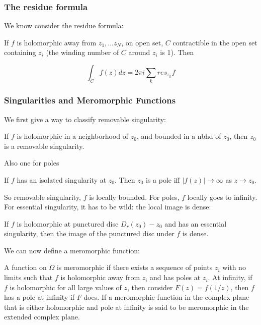 \documentclass[main.tex]{subfiles}
\begin{document}
\subsubsection{The residue formula}
We know consider the residue formula:

\begin{theorem}
If $f$ is holomorphic away from $z_1, ... z_N$, on open set, $C$ contractible in the open set containing $z_i$ (the winding number of $C$ around $z_i$ is 1). Then 

$$
\int_C f(z) dz = 2\pi i \sum_k res_{z_k} f
$$
\end{theorem}

\subsubsection{Singularities and Meromorphic Functions}

We first give a way to classify removable singularity:

\begin{theorem}
If $f$ is holomorphic in a neighborhood of $z_0$, and bounded in a nbhd of $z_0$, then $z_0$ is a removable singularity. 
\end{theorem}

Also one for poles
\begin{corollary}
If $f$ has an isolated singularity at $z_0$. Then $z_0$ is a pole iff $|f(z)| \rightarrow \infty$ as $z \rightarrow z_0$.
\end{corollary}

So removable singularity, $f$ is locally bounded. For poles, $f$ locally goes to infinity. For essential singularity, it has to be wild: the local image is dense:

\begin{theorem}
If $f$ is holomorphic at punctured disc 
$D_r(z_0) - z_0$ and has an essential singularity, then the image of the punctured disc under $f$ is dense.
\end{theorem}

We can now define a meromorphic function:
\begin{definition}
A function on $\Omega$ is meromorphic if there exists a sequence of points $z_i$ with no limits such that $f$ is holomorphic away from $z_i$ and has poles at $z_i$. At infinity, if $f$ is holomorphic for all large values of $z$, then consider $F(z) = f(1/z)$, then $f$ has a pole at infinity if $F$ does. If a meromorphic function in the complex plane that is either holomorphic and pole at infinity is said to be meromorphic in the extended complex plane.
\end{definition}
\end{document}
